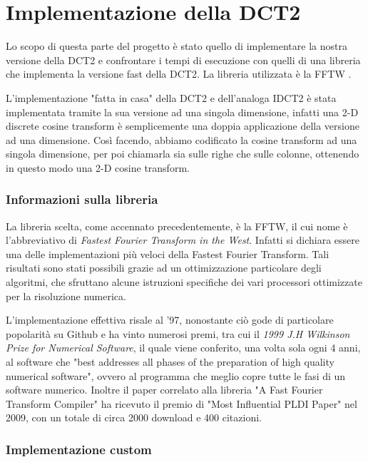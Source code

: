 	
\part{Implementazione della DCT2}

Lo scopo di questa parte del progetto è stato quello di implementare la nostra versione della DCT2 e confrontare i tempi di esecuzione con quelli di una libreria che implementa la versione fast della DCT2. La libreria utilizzata è la FFTW \cite{fftw}.

L'implementazione "fatta in casa" della DCT2 e dell'analoga IDCT2 è stata implementata tramite la sua versione ad una singola dimensione, infatti una 2-D discrete cosine transform è semplicemente una doppia applicazione della versione ad una dimensione. Così facendo, abbiamo codificato la cosine transform ad una singola dimensione, per poi chiamarla sia sulle righe che sulle colonne, ottenendo in questo modo una 2-D cosine transform.

\section{Informazioni sulla libreria}

La libreria scelta, come accennato precedentemente, è la FFTW, il cui nome è l'abbreviativo di \textit{Fastest Fourier Transform in the West}. Infatti si dichiara essere una delle implementazioni più veloci della Fastest Fourier Transform. Tali risultati sono stati possibili grazie ad un ottimizzazione particolare degli algoritmi, che sfruttano alcune istruzioni specifiche dei vari processori ottimizzate per la risoluzione numerica.

L'implementazione effettiva risale al '97, nonostante ciò gode di particolare popolarità su Github\cite{Github} e ha vinto numerosi premi, tra cui il \textit{1999 J.H Wilkinson Prize for Numerical Software}, il quale viene conferito, una volta sola ogni 4 anni, al software che "best addresses all phases of the preparation of high quality numerical software", ovvero al programma che meglio copre tutte le fasi di un software numerico. Inoltre il paper correlato alla libreria "A Fast Fourier Transform Compiler"\cite{fftw_paper} ha ricevuto il premio di "Most Influential PLDI Paper" nel 2009, con un totale di circa 2000 download e 400 citazioni.

\section{Implementazione custom}

